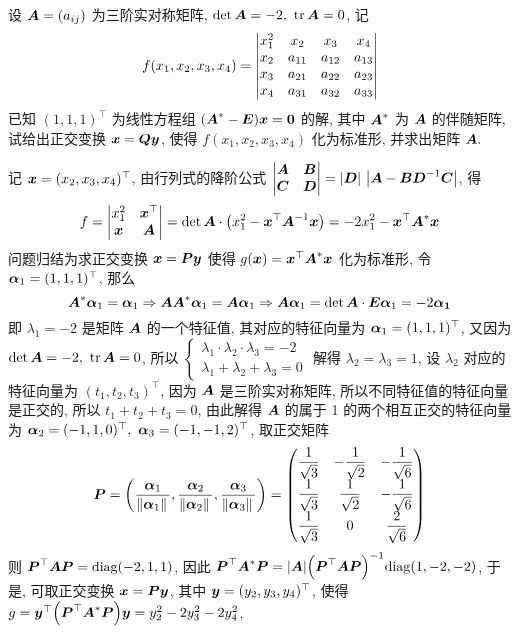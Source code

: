 \begin{example}
    设 $\vb*{A}=(a_{ij})$ 为三阶实对称矩阵, $\det\vb*{A}=-2,~\tr\vb*{A}=0$, 记 $$f(x_1,x_2,x_3,x_4)=\mqty|x_1^2&x_2&x_3&x_4\\x_2&a_{11}&a_{12}&a_{13}\\x_3&a_{21}&a_{22}&a_{23}\\x_4&a_{31}&a_{32}&a_{33}|$$
    已知 $(1,1,1)^\top$ 为线性方程组 $\qty(\vb*{A}^*-\vb*{E})\vb*{x}=\vb*{0}$ 的解, 其中 $\vb*{A}^*$ 为 $\vb*{A}$ 的伴随矩阵, 试给出正交变换 $\vb*{x}=\vb*{Qy}$, 使得 $f(x_1,x_2,x_3,x_4)$ 化为标准形, 并求出矩阵 $\vb*{A}.$
\end{example}
\begin{solution}
    记 $\vb*{x}=(x_2,x_3,x_4)^\top$, 由行列式的降阶公式 $\mqty|\vb*{A}&\vb*{B}\\\vb*{C}&\vb*{D}|=|\vb*{D}|~\qty|\vb*{A}-\vb*{BD}^{-1}\vb*{C}|$, 得
    $$f=\mqty|x_1^2&\vb*{x}^\top\\\vb*{x}&\vb*{A}|=\det\vb*{A}\cdot\qty(x_1^2-\vb*{x}^\top\vb*{A}^{-1}\vb*{x})=-2x_1^2-\vb*{x}^\top\vb*{A}^*\vb*{x}$$
    问题归结为求正交变换 $\vb*{x}=\vb*{Py}$ 使得 $g(\vb*{x})=\vb*{x}^\top\vb*{A}^*\vb*{x}$ 化为标准形, 令 $\vb*{\alpha}_1=(1,1,1)^\top$, 那么
    $$\vb*{A}^*\vb*{\alpha}_1=\vb*{\alpha}_1\Rightarrow \vb*{AA}^*\vb*{\alpha}_1=\vb*{A\alpha}_1\Rightarrow \vb*{A\alpha}_1=\det\vb*{A}\cdot\vb*{E\alpha}_1=-2\vb*{\alpha_1}$$
    即 $\lambda_1=-2$ 是矩阵 $\vb*{A}$ 的一个特征值, 其对应的特征向量为 $\vb*{\alpha}_1=(1,1,1)^\top$, 又因为 $\det\vb*{A}=-2,~\tr\vb*{A}=0$, 所以 $\begin{cases}
            \lambda_1\cdot\lambda_2\cdot\lambda_3=-2 \\
            \lambda_1+\lambda_2+\lambda_3=0
        \end{cases}$ 解得 $\lambda_2=\lambda_3=1$, 设 $\lambda_2$ 对应的特征向量为 $(t_1,t_2,t_3)^\top$, 因为 $\vb*{A}$ 是三阶实对称矩阵, 所以不同特征值的特征向量是正交的, 所以 $t_1+t_2+t_3=0$, 由此解得 $\vb*{A}$ 的属于 1 的两个相互正交的特征向量为 $\vb*{\alpha}_2=(-1,1,0)^\top,~\vb*{\alpha}_3=(-1,-1,2)^\top$, 取正交矩阵
    $$\vb*{P}=\qty(\dfrac{\vb*{\alpha}_1}{\norm*{\vb*{\alpha}_1}},\dfrac{\vb*{\alpha}_2}{\norm*{\vb*{\alpha}_2}},\dfrac{\vb*{\alpha}_3}{\norm*{\vb*{\alpha}_3}})=\mqty(\dfrac{1}{\sqrt{3}}&-\dfrac{1}{\sqrt{2}}&-\dfrac{1}{\sqrt{6}}\\[6pt]\dfrac{1}{\sqrt{3}}&\dfrac{1}{\sqrt{2}}&-\dfrac{1}{\sqrt{6}}\\[6pt]\dfrac{1}{\sqrt{3}}&0&\dfrac{2}{\sqrt{6}})$$
    则 $\vb*{P}^\top\vb*{AP}=\mathrm{diag}(-2,1,1)$, 因此 $\vb*{P}^\top\vb*{A}^*\vb*{P}=|\vb*{A}|\qty(\vb*{P}^\top\vb*{AP})^{-1}\mathrm{diag}(1,-2,-2)$, 于是, 可取正交变换 $\vb*{x}=\vb*{Py}$, 其中 $\vb*{y}=(y_2,y_3,y_4)^\top$, 使得 $g=\vb*{y}^\top\qty(\vb*{P}^\top\vb*{A}^*\vb*{P})\vb*{y}=y_2^2-2y_3^2-2y_4^2$,

\end{solution}
